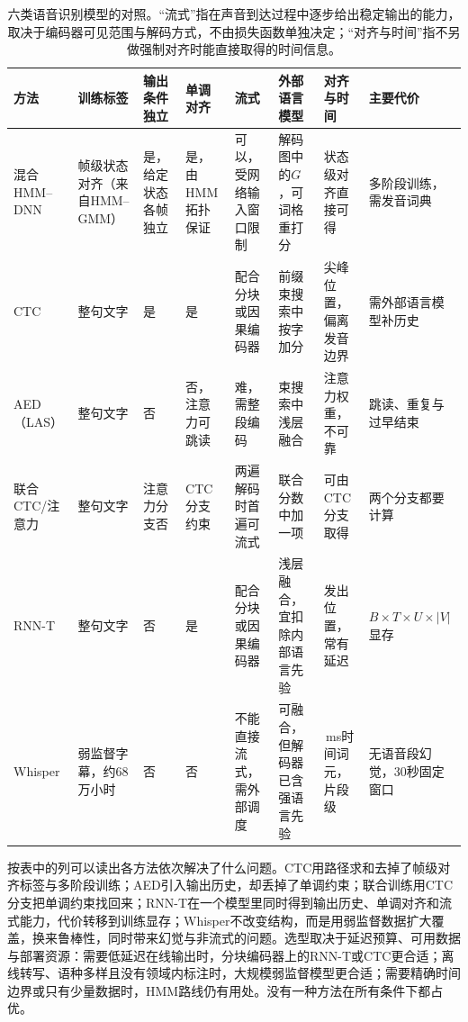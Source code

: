 \begin{table}[htbp]
  \centering
  \footnotesize
  \begin{tabularx}{\linewidth}{@{}>{\raggedright\arraybackslash}p{17mm}>{\raggedright\arraybackslash}p{16mm}>{\raggedright\arraybackslash}p{13mm}>{\raggedright\arraybackslash}p{14mm}>{\raggedright\arraybackslash}p{17mm}>{\raggedright\arraybackslash}p{19mm}>{\raggedright\arraybackslash}p{17mm}>{\raggedright\arraybackslash}X@{}}
    \toprule
    方法 & 训练标签 & 输出条件独立 & 单调对齐 & 流式 & 外部语言模型 & 对齐与时间 & 主要代价\\
    \midrule
    混合HMM--DNN & 帧级状态对齐（来自HMM--GMM） & 是，给定状态各帧独立 & 是，由HMM拓扑保证 & 可以，受网络输入窗口限制 & 解码图中的$G$，可词格重打分 & 状态级对齐直接可得 & 多阶段训练，需发音词典\\
    CTC & 整句文字 & 是 & 是 & 配合分块或因果编码器 & 前缀束搜索中按字加分 & 尖峰位置，偏离发音边界 & 需外部语言模型补历史\\
    AED（LAS） & 整句文字 & 否 & 否，注意力可跳读 & 难，需整段编码 & 束搜索中浅层融合 & 注意力权重，不可靠 & 跳读、重复与过早结束\\
    联合CTC/\allowbreak 注意力 & 整句文字 & 注意力分支否 & CTC分支约束 & 两遍解码时首遍可流式 & 联合分数中加一项 & 可由CTC分支取得 & 两个分支都要计算\\
    RNN-T & 整句文字 & 否 & 是 & 配合分块或因果编码器 & 浅层融合，宜扣除内部语言先验 & 发出位置，常有延迟 & $B\times T\times U\times|V|$显存\\
    Whisper & 弱监督字幕，约68万小时 & 否 & 否 & 不能直接流式，需外部调度 & 可融合，但解码器已含强语言先验 & 20\,ms时间词元，片段级 & 无语音段幻觉，30秒固定窗口\\
    \bottomrule
  \end{tabularx}
  \caption{六类语音识别模型的对照。“流式”指在声音到达过程中逐步给出稳定输出的能力，取决于编码器可见范围与解码方式，不由损失函数单独决定；“对齐与时间”指不另做强制对齐时能直接取得的时间信息。}
  \label{tab:nlp-speech-asr-comparison}
\end{table}

按表中的列可以读出各方法依次解决了什么问题。CTC用路径求和去掉了帧级对齐标签与多阶段训练；AED引入输出历史，却丢掉了单调约束；联合训练用CTC分支把单调约束找回来；RNN-T在一个模型里同时得到输出历史、单调对齐和流式能力，代价转移到训练显存；Whisper不改变结构，而是用弱监督数据扩大覆盖，换来鲁棒性，同时带来幻觉与非流式的问题。选型取决于延迟预算、可用数据与部署资源：需要低延迟在线输出时，分块编码器上的RNN-T或CTC更合适；离线转写、语种多样且没有领域内标注时，大规模弱监督模型更合适；需要精确时间边界或只有少量数据时，HMM路线仍有用处。没有一种方法在所有条件下都占优。
